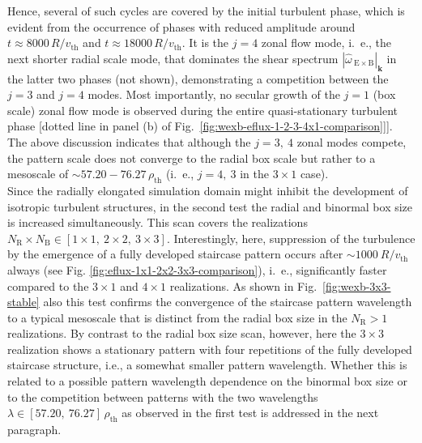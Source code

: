 \documentclass[aip, amsmath, amssymb, reprint, twocolumn]{revtex4-1}
\newcommand{\NR}{N_\mathrm{R}}
\newcommand{\NB}{N_\mathrm{B}}
\newcommand{\rhoth}{\rho_\mathrm{th}}
\newcommand{\vth}{v_{\mathrm{th}}}
\begin{document}
Hence, several of such cycles are covered by the initial turbulent phase, which is evident from the occurrence of phases with reduced amplitude around $t \approx 8000\,R/\vth$ and $t \approx 18000\,    R/\vth$.
It is the $j = 4$ zonal flow mode, i.~e., the next shorter radial scale mode, that dominates the shear spectrum $|\widehat{\omega}_{\mathrm{\:E \times B}}|_{\mathbf{k}}   $ in the latter two phases (not shown), demonstrating a competition between the $j = 3$ and $j = 4$ modes.
Most importantly, no secular growth of the $j = 1$ (box scale) zonal flow mode is observed during the entire quasi-stationary turbulent phase [dotted line in panel (b) of Fig.~\ref{fig:wexb-eflux-1-2-3-4x1-comparison}]].
The above discussion indicates that although the $j = 3,~4$ zonal modes compete, the pattern scale does not converge to the radial box scale but rather to a mesoscale of $\sim 57.20 - 76.27\,\rhoth$ (i.~e., $j = 4,~3$ in the $3\times1$ case). \\

Since the radially elongated simulation domain might inhibit the development of isotropic turbulent structures, in the second test the radial and binormal box size is increased simultaneously.
This scan covers the realizations $\NR\times\NB \in [1\times1,~2\times2,~3\times3]$.
Interestingly, here, suppression of the turbulence by the emergence of a fully developed staircase pattern occurs after $\sim 1000~R/\vth$ always (see Fig. \ref{fig:eflux-1x1-2x2-3x3-comparison}), i.~e., significantly faster compared to the $3\times1$ and $4\times1$ realizations. 
%
As shown in Fig.~\ref{fig:wexb-3x3-stable} also this test confirms the convergence of the staircase pattern wavelength to a typical mesoscale that is distinct from the radial box size in the $\NR > 1$ realizations. 
By contrast to the radial box size scan, however, here the $3\times3$ realization shows a stationary pattern with four repetitions of the fully developed staircase structure, i.e., a somewhat smaller pattern wavelength. 
Whether this is related to a possible pattern wavelength dependence on the binormal box size or to the competition between patterns with the two wavelengths $\lambda \in [57.20,~ 76.27]\,\rhoth$ as observed in the first test is addressed in the next paragraph. \bigskip
\end{document}
